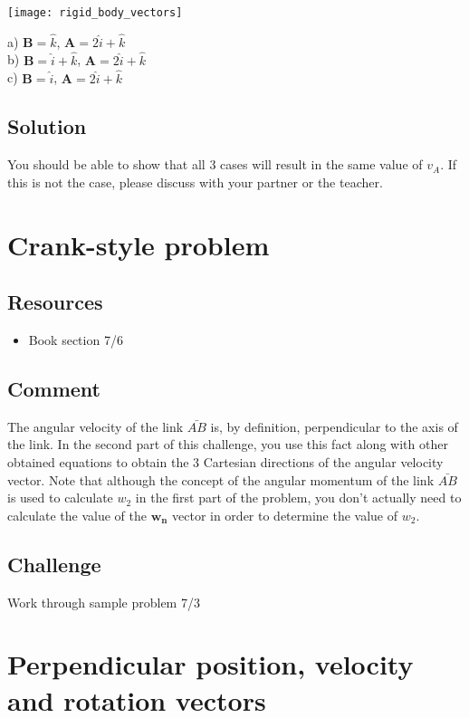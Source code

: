 \texttt{[image: rigid\_body\_vectors]}

a) $\bm{B} = \hat{k}$,              $\bm{A} = 2 \hat{i} + \hat{k}$\\
b) $\bm{B} = \hat{i} + \hat{k}$,    $\bm{A} = 2 \hat{i} + \hat{k}$\\
c) $\bm{B} = \hat{i}$,              $\bm{A} = 2 \hat{i} + \hat{k}$

\subsection*{Solution}
You should be able to show that all 3 cases will result in the same value of $v_A$. If this is not the case, please discuss with your partner or the teacher.



\iffalse
\newpage
\section{Crank-style problem}

\subsection*{Resources}
\begin{itemize}
    \item Book section 7/6
\end{itemize}

\subsection*{Comment}
The angular velocity of the link $\bar{AB}$ is, by definition, perpendicular to the axis of the link. In the second part of this challenge, you use this fact along with other obtained equations to obtain the 3 Cartesian directions of the angular velocity vector. Note that although the concept of the angular momentum of the link $\bar{AB}$ is used to calculate $w_2$ in the first part of the problem, you don't actually need to calculate the value of the $\bm{w_n}$ vector in order to determine the value of $w_2$.

\subsection*{Challenge}
Work through sample problem 7/3




\newpage
\section{Perpendicular position, velocity and rotation vectors}

